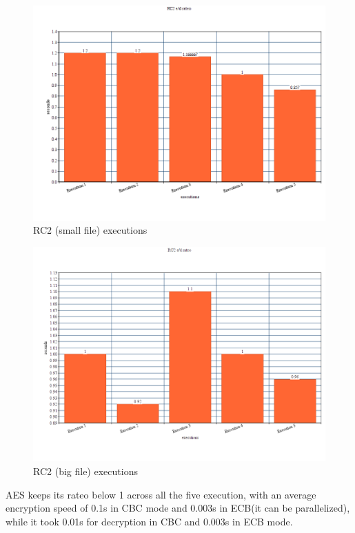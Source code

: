 \documentclass{article}
\begin{document}
	\begin{figure}[h] 
		\includegraphics[width=1\textwidth ]{images/RC2.png}
		\centering
		\caption{RC2 (small file) executions}
	\end{figure}
	
	\begin{figure}[h] 
		\includegraphics[width=1\textwidth ]{images/RC2(big).png}
		\centering
		\caption{RC2 (big file) executions}
	\end{figure}
	
	\clearpage
	
	AES keeps its rateo below 1 across all the five execution, with an average encryption speed of
	0.1s in CBC mode and 0.003s in ECB(it can be parallelized), while it took  0.01s for decryption in 	CBC and 0.003s in ECB mode.\\
	
\end{document}
